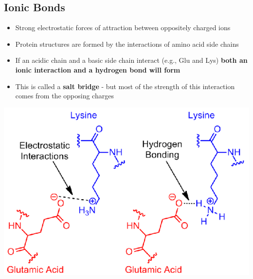 \documentclass[10pt]{article}
\begin{document}
\subsection*{Ionic Bonds}
\begin{itemize}
    \item Strong electrostatic forces of attraction between oppositely charged ions
    \item Protein structures are formed by the interactions of amino acid side chains
    \item If an acidic chain and a basic side chain interact (e.g., Glu and Lys) \textbf{both an ionic interaction and a hydrogen bond will form}
    \item This is called a \textbf{salt bridge} - but most of the strength of this interaction comes from the opposing charges
\end{itemize}
\begin{center}
    \includegraphics*[scale=0.6]{L3_1.png}
\end{center}
\end{document}
